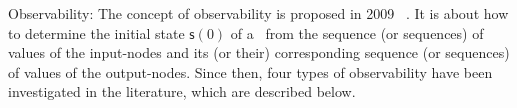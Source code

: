 Observability: The concept of observability is proposed in 2009 ~\cite{cheng2009controllability}. It is about how to determine the initial state $\mathsf{s}(0)$ of a \BCN\ from the sequence (or sequences) of values of the input-nodes and its (or their) corresponding sequence (or sequences) of values of the output-nodes. Since then, four types of observability have been investigated in the literature, which are described below.


